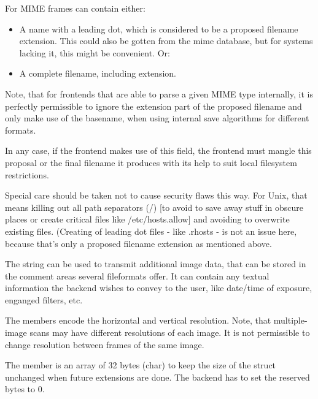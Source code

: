 \documentclass[11pt,DVIps]{report}
\begin{document}
\begin{changebar}
For MIME frames  can contain either: 

\begin{itemize}
\item
A name with a leading dot, which is considered to be a proposed 
filename extension. This could also be gotten from the mime database, 
but for systems lacking it, this might be convenient. Or: 

\item
A complete filename, including extension. 
\end{itemize}

Note, that for frontends that are able to parse a given MIME type 
internally, it is perfectly permissible to ignore the extension 
part of the proposed filename and only make use of the basename, 
when using internal save algorithms for different formats. 

In any case, if the frontend makes use of this field, the frontend 
must mangle this proposal or the final filename it produces with 
its help to suit local filesystem restrictions. 

Special care should be taken not to cause security flaws this way. 
For Unix, that means killing out all path separators (/) [to avoid 
to save away stuff in obscure places or create critical files like 
/etc/hosts.allow] and avoiding to overwrite existing files. 
(Creating of leading dot files - like .rhosts - is not an issue here, 
because that's only a proposed filename extension as mentioned above.

The string  can be used to transmit additional 
image data, that can be stored in the comment areas several fileformats 
offer. It can contain any textual information the backend wishes to 
convey to the user, like date/time of exposure, enganged filters, 
etc. 

The members  encode the horizontal and vertical 
resolution. Note, that multiple-image scans may have different
resolutions of each image. It is not permissible to change resolution 
between frames of the same image.

The member  is an array of 32 bytes (char) to keep
the size of the struct unchanged when future extensions are done.
The backend has to set the reserved bytes to 0.
\end{changebar}


\subsection{}
\end{document}
